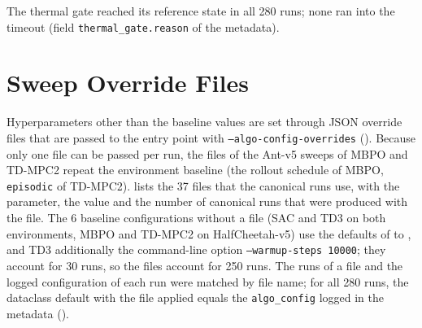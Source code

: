 The thermal gate reached its reference state in all \num{280} runs; none ran into the timeout (field \texttt{thermal\_\allowbreak gate.reason} of the metadata).

\section{Sweep Override Files}\label{sec:app-hp-sweeps}

Hyperparameters other than the baseline values are set through JSON override files that are passed to the entry point with \texttt{--algo-config-overrides} ().
Because only one file can be passed per run, the files of the Ant-v5 sweeps of MBPO and TD-MPC2 repeat the environment baseline (the rollout schedule of MBPO, \texttt{episodic} of TD-MPC2).
 lists the \num{37} files that the canonical runs use, with the parameter, the value and the number of canonical runs that were produced with the file.
The \num{6} baseline configurations without a file (SAC and TD3 on both environments, MBPO and TD-MPC2 on HalfCheetah-v5) use the defaults of  to , and TD3 additionally the command-line option \texttt{--warmup-steps 10000}; they account for \num{30} runs, so the files account for \num{250} runs.
The runs of a file and the logged configuration of each run were matched by file name; for all \num{280} runs, the dataclass default with the file applied equals the \texttt{algo\_\allowbreak config} logged in the metadata ().

